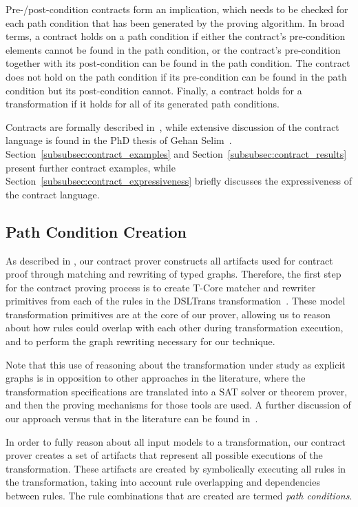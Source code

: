  Pre-/post-condition contracts form an implication, which needs to be checked
 for each path condition that has been generated by the proving algorithm. In broad
 terms, a contract holds on a path condition if either the contract's
 pre-condition elements cannot be found in the path condition, or the contract's pre-condition
 together with its post-condition can be found in the path condition. The contract
 does not hold on the path condition if its pre-condition can be
 found in the path condition but its post-condition cannot. Finally, a contract
 holds for a transformation if it holds for all of its generated path conditions.

 Contracts are formally described in~\cite{Lucio2014}, while extensive discussion of the contract language is found in the PhD thesis of Gehan Selim~\cite{Selim2015}. Section~\ref{subsubsec:contract_examples} and Section~\ref{subsubsec:contract_results} present further contract examples, while Section~\ref{subsubsec:contract_expressiveness} briefly discusses the expressiveness of the contract language.

\subsection{Path Condition Creation}
\label{subsec:contract_prover}

As described in \cite{Lucio2015}, our contract prover constructs all artifacts used for contract proof through matching and rewriting of typed graphs. Therefore, the first step for the contract proving process is to create T-Core matcher and rewriter primitives from each of the rules
in the DSLTrans transformation~\cite{Syriani2013}. These model transformation primitives are at the core of our prover, allowing us to
reason about how rules could overlap with each other during transformation
execution, and to perform the graph rewriting necessary for our
technique.

Note that this use of reasoning about the transformation under study as explicit graphs is in opposition to other approaches in the literature, where the transformation specifications are translated into a SAT solver or theorem prover, and then the proving mechanisms for those tools are used. A further discussion of our approach versus that in the literature can be found in~\cite{Selim2015}.

In order to fully reason about all input models to a transformation, our contract prover creates a set of artifacts that represent all
possible executions of the transformation. These artifacts are created by
symbolically executing all rules in the transformation, taking into account
rule overlapping and dependencies between rules. The rule combinations that are
created are termed \textit{path conditions}.

